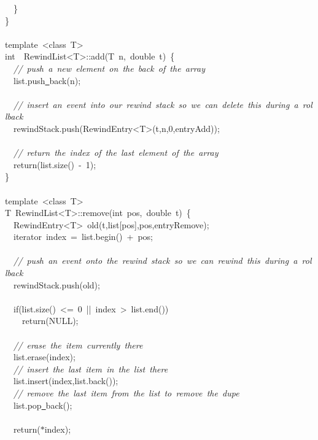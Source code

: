 {\ \ \}\\
\}\\
\ \\
template\ <{}class\ T>{}\\
int\ \ RewindList<{}T>{}::add(T\ n,\ double\ t)\ \{\\
\ \ \textsl{//\ push\ a\ new\ element\ on\ the\ back\ of\ the\ array}\\
\ \ list.push\underline\ back(n);\\
\ \\
\ \ \textsl{//\ insert\ an\ event\ into\ our\ rewind\ stack\ so\ we\ can\ delete\ this\ during\ a\ rollback}\\
\ \ rewindStack.push(RewindEntry<{}T>{}(t,n,0,entryAdd));\\
\ \\
\ \ \textsl{//\ return\ the\ index\ of\ the\ last\ element\ of\ the\ array}\\
\ \ return(list.size()\ -{}\ 1);\\
\}\\
\ \\
template\ <{}class\ T>{}\\
T\ RewindList<{}T>{}::remove(int\ pos,\ double\ t)\ \{\\
\ \ RewindEntry<{}T>{}\ old(t,list[pos],pos,entryRemove);\\
\ \ iterator\ index\ =\ list.begin()\ +\ pos;\\
\ \\
\ \ \textsl{//\ push\ an\ event\ onto\ the\ rewind\ stack\ so\ we\ can\ rewind\ this\ during\ a\ rollback}\\
\ \ rewindStack.push(old);\\
\ \\
\ \ if(list.size()\ <{}=\ 0\ ||\ index\ >{}\ list.end())\\
\ \ \ \ return(NULL);\\
\ \\
\ \ \textsl{//\ erase\ the\ item\ currently\ there}\\
\ \ list.erase(index);\\
\ \ \textsl{//\ insert\ the\ last\ item\ in\ the\ list\ there}\\
\ \ list.insert(index,list.back());\\
\ \ \textsl{//\ remove\ the\ last\ item\ from\ the\ list\ to\ remove\ the\ dupe}\\
\ \ list.pop\underline\ back();\\
\ \\
\ \ return($\ast$index);\\
}
